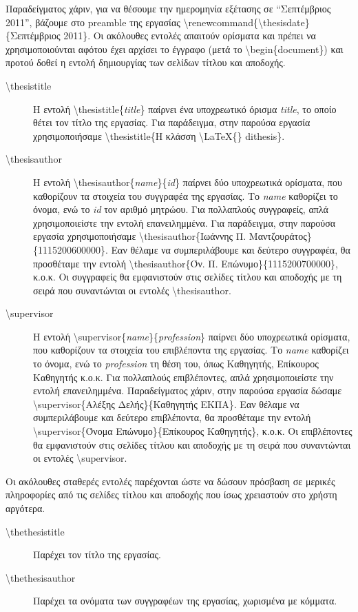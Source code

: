 \documentclass[english]{dithesis} %
\begin{document}
Παραδείγματος χάριν, για να θέσουμε την ημερομηνία εξέτασης σε ``Σεπτέμβριος
2011'', βάζουμε στο preamble της εργασίας
\textbackslash{renewcommand}\{\textbackslash{thesisdate}\}\{Σεπτέμβριος 2011\}.
Οι ακόλουθες εντολές απαιτούν ορίσματα και πρέπει να χρησιμοποιούνται αφότου
έχει αρχίσει το έγγραφο (μετά το \textbackslash{begin}\{document\}) και προτού
δοθεί η εντολή δημιουργίας των σελίδων τίτλου και αποδοχής.
\begin{description}
\item[\textbackslash{thesistitle}]
  Η εντολή \textbackslash{thesistitle}\{\textit{title}\} παίρνει ένα
  υποχρεωτικό όρισμα \textit{title}, το οποίο θέτει τον τίτλο της εργασίας.
  Για παράδειγμα, στην παρούσα εργασία χρησιμοποιήσαμε
  \textbackslash{thesistitle}\{Η κλάσση \textbackslash{LaTeX}\{\} dithesis\}.
\item[\textbackslash{thesisauthor}]
  Η εντολή \textbackslash{thesisauthor}\{\textit{name}\}\{\textit{id}\} παίρνει
  δύο υποχρεωτικά ορίσματα, που καθορίζουν τα στοιχεία του συγγραφέα της
  εργασίας.
  Το \textit{name} καθορίζει το όνομα, ενώ το \textit{id} τον αριθμό μητρώου.
  Για πολλαπλούς συγγραφείς, απλά χρησιμοποιείστε την εντολή επανειλημμένα.
  Για παράδειγμα, στην παρούσα εργασία χρησιμοποιήσαμε
  \textbackslash{thesisauthor}\{Ιωάννης Π. Μαντζουράτος\}\{1115200600000\}.
  Εαν θέλαμε να συμπεριλάβουμε και δεύτερο συγγραφέα, θα προσθέταμε την εντολή
  \textbackslash{thesisauthor}\{Όν. Π. Επώνυμο\}\{1115200700000\}, κ.ο.κ.
  Οι συγγραφείς θα εμφανιστούν στις σελίδες τίτλου και αποδοχής με τη σειρά
  που συναντώνται οι εντολές \textbackslash{thesisauthor}.
\item[\textbackslash{supervisor}]
  Η εντολή \textbackslash{supervisor}\{\textit{name}\}\{\textit{profession}\}
  παίρνει δύο υποχρεωτικά ορίσματα, που καθορίζουν τα στοιχεία του επιβλέποντα
  της εργασίας.
  Το \textit{name} καθορίζει το όνομα, ενώ το \textit{profession} τη θέση του,
  όπως Καθηγητής, Επίκουρος Καθηγητής κ.ο.κ.
  Για πολλαπλούς επιβλέποντες, απλά χρησιμοποιείστε την εντολή επανειλημμένα.
  Παραδείγματος χάριν, στην παρούσα εργασία δώσαμε
  \textbackslash{supervisor}\{Αλέξης Δελής\}\{Καθηγητής ΕΚΠΑ\}.
  Εαν θέλαμε να συμπεριλάβουμε και δεύτερο επιβλέποντα, θα προσθέταμε την
  εντολή \textbackslash{supervisor}\{Όνομα Επώνυμο\}\{Επίκουρος Καθηγητής\},
  κ.ο.κ.
  Οι επιβλέποντες θα εμφανιστούν στις σελίδες τίτλου και αποδοχής με τη σειρά
  που συναντώνται οι εντολές \textbackslash{supervisor}.
\end{description}
Οι ακόλουθες σταθερές εντολές παρέχονται ώστε να δώσουν πρόσβαση σε μερικές
πληροφορίες από τις σελίδες τίτλου και αποδοχής που ίσως χρειαστούν στο χρήστη
αργότερα.
\begin{description}
\item[\textbackslash{thethesistitle}]
  Παρέχει τον τίτλο της εργασίας.
\item[\textbackslash{thethesisauthor}]
  Παρέχει τα ονόματα των συγγραφέων της εργασίας, χωρισμένα με κόμματα.
\end{description}
\end{document}
